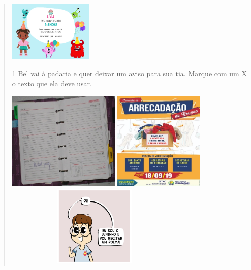 \begin{verse}
{\includegraphics[width=1.58681in,height=1.13333in]{media/image92.png}
}



\num{1} Bel vai à padaria e quer deixar um aviso para sua tia. 
Marque com um X o texto que ela deve usar.


\includegraphics[width=2.10625in,height=1.86042in]{media/image93.jpeg}
\includegraphics[width=1.68611in,height=1.86042in]{media/image94.jpeg}
\includegraphics[width=3.36528in,height=1.53611in]{media/image97.png}


\end{verse}
